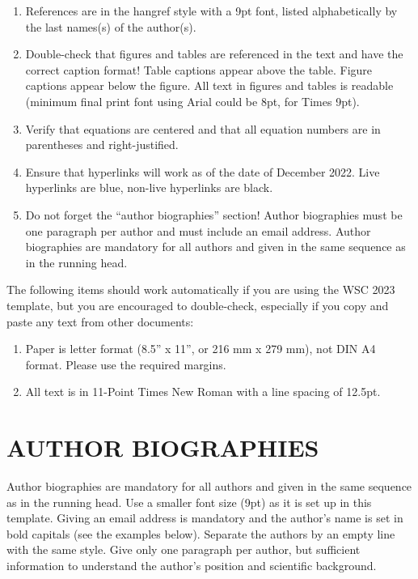 \documentclass{wscpaperproc}
\theoremstyle{wsc}
\begin{document}
\begin{enumerate}
\item References are in the hangref style with a 9pt font, listed alphabetically by the last names(s) of the author(s).
\item Double-check that figures and tables are referenced in the text and have the correct caption format! Table captions appear above the table. Figure captions appear below the figure. All text in figures and tables is readable (minimum final print font using Arial could be 8pt, for Times 9pt).
\item Verify that equations are centered and that all equation numbers are in parentheses and right-justified.
\item Ensure that hyperlinks will work as of the date of December 2022. Live hyperlinks are blue, non-live hyperlinks are black.
\item	Do not forget the ``author biographies'' section! Author biographies must be one paragraph per author and must include an email address. Author biographies are mandatory for all authors and given in the same sequence as in the running head. 
\end{enumerate}

The following items should work automatically if you are using the WSC 2023 template, but you are encouraged to double-check, especially if you copy and paste any text from other documents:

\begin{enumerate}
\item Paper is letter format (8.5'' x 11'', or 216 mm x 279 mm), not DIN A4 format. Please use the required margins. 
\item All text is in 11-Point Times New Roman with a line spacing of 12.5pt.
\end{enumerate}

\footnotesize






\section*{AUTHOR BIOGRAPHIES}

{\normalsize Author biographies are mandatory for all authors and given in the same sequence as in the running head. Use a smaller font size (9pt) as it is set up in this template. Giving an email address is mandatory and the author’s name is set in bold capitals (see the examples below). Separate the authors by an empty line with the same style. Give only one paragraph per author, but sufficient information to understand the author’s position and scientific background.}\\
\end{document}
